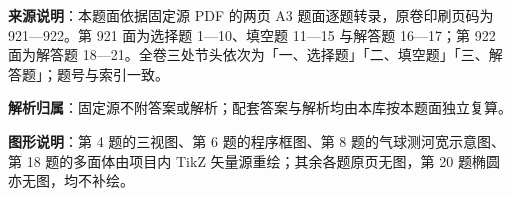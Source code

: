 

\begin{gknotice}
\textbf{来源说明}：本题面依据固定源 PDF 的两页 A3 题面逐题转录，原卷印刷页码为 921—922。第 921 面为选择题 1—10、填空题 11—15 与解答题 16—17；第 922 面为解答题 18—21。全卷三处节头依次为「一、选择题」「二、填空题」「三、解答题」；题号与索引一致。

\textbf{解析归属}：固定源不附答案或解析；配套答案与解析均由本库按本题面独立复算。

\textbf{图形说明}：第 4 题的三视图、第 6 题的程序框图、第 8 题的气球测河宽示意图、第 18 题的多面体由项目内 TikZ 矢量源重绘；其余各题原页无图，第 20 题椭圆亦无图，均不补绘。
\end{gknotice}



